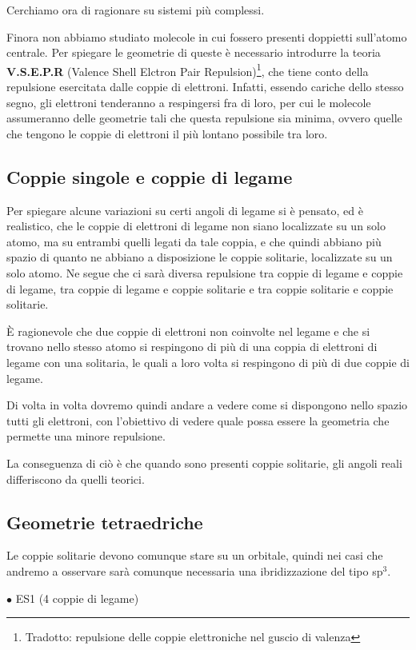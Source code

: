 Cerchiamo ora di ragionare su sistemi più complessi.

Finora non abbiamo studiato molecole in cui fossero presenti doppietti sull'atomo centrale. Per spiegare le geometrie di queste è necessario introdurre la teoria \textbf{V.S.E.P.R} (Valence Shell Elctron Pair Repulsion)\footnote{Tradotto: repulsione delle coppie elettroniche nel guscio di valenza}, che tiene conto della repulsione esercitata dalle coppie di elettroni. Infatti, essendo cariche dello stesso segno, gli elettroni tenderanno a respingersi fra di loro, per cui le molecole assumeranno delle geometrie tali che questa repulsione sia minima, ovvero quelle che tengono le coppie di elettroni il più lontano possibile tra loro.
\subsection{Coppie singole e coppie di legame}
Per spiegare alcune variazioni su certi angoli di legame si è pensato, ed è realistico, che le coppie di elettroni di legame non siano localizzate su un solo atomo, ma su entrambi quelli legati da tale coppia, e che quindi abbiano più spazio di quanto ne abbiano a disposizione le coppie solitarie, localizzate su un solo atomo. Ne segue che ci sarà diversa repulsione tra coppie di legame e coppie di legame, tra coppie di legame e coppie solitarie e tra coppie solitarie e coppie solitarie.

È ragionevole che due coppie di elettroni non coinvolte nel legame e che si trovano nello stesso atomo si respingono di più di una coppia di elettroni di legame con una solitaria, le quali a loro volta si respingono di più di due coppie di legame.

Di volta in volta dovremo quindi andare a vedere come si dispongono nello spazio tutti gli elettroni, con l'obiettivo di vedere quale possa essere la geometria che permette una minore repulsione.

La conseguenza di ciò è che quando sono presenti coppie solitarie, gli angoli reali differiscono da quelli teorici.
\subsection{Geometrie tetraedriche}
Le coppie solitarie devono comunque stare su un orbitale, quindi nei casi che andremo a osservare sarà comunque necessaria una ibridizzazione del tipo sp$^3$.

$\bullet$ ES1  (4 coppie di legame)
    
